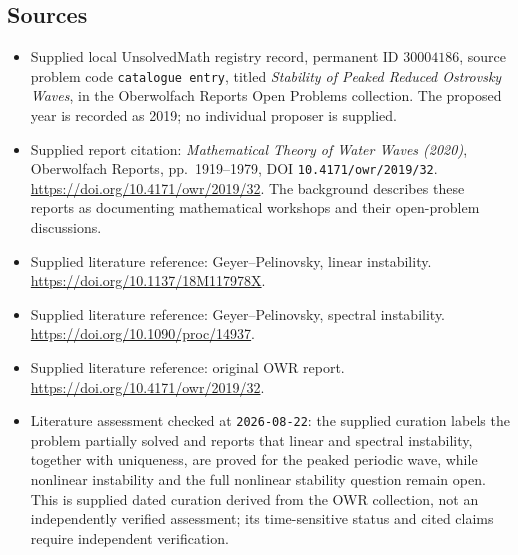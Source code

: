 \documentclass[11pt]{article}
\begin{document}
\subsection{Sources}
\begin{itemize}
\item Supplied local UnsolvedMath registry record, permanent ID \(30004186\), source problem code \texttt{catalogue entry}, titled \emph{Stability of Peaked Reduced Ostrovsky Waves}, in the Oberwolfach Reports Open Problems collection. The proposed year is recorded as 2019; no individual proposer is supplied.
\item Supplied report citation: \emph{Mathematical Theory of Water Waves (2020)}, Oberwolfach Reports, pp.~1919--1979, DOI \texttt{10.4171/owr/2019/32}. \url{https://doi.org/10.4171/owr/2019/32}. The background describes these reports as documenting mathematical workshops and their open-problem discussions.
\item Supplied literature reference: Geyer--Pelinovsky, linear instability. \url{https://doi.org/10.1137/18M117978X}.
\item Supplied literature reference: Geyer--Pelinovsky, spectral instability. \url{https://doi.org/10.1090/proc/14937}.
\item Supplied literature reference: original OWR report. \url{https://doi.org/10.4171/owr/2019/32}.
\item Literature assessment checked at \texttt{2026-08-22}: the supplied curation labels the problem partially solved and reports that linear and spectral instability, together with uniqueness, are proved for the peaked periodic wave, while nonlinear instability and the full nonlinear stability question remain open. This is supplied dated curation derived from the OWR collection, not an independently verified assessment; its time-sensitive status and cited claims require independent verification.
\end{itemize}
\end{document}
